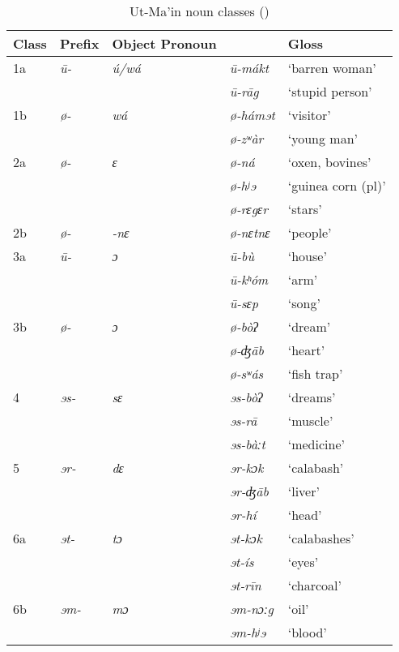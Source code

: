 \documentclass[output=paper]{langsci/langscibook}
\begin{document}
\begin{table}[t!]
\footnotesize
\caption{\label{tab:kainji:9} Ut-Ma’in noun classes (\citet{Paterson2012})}
\begin{tabularx}{\textwidth}{llXXl}
\lsptoprule
{{Class}}	& {Prefix}	& {Object Pronoun}	& {\ilit{Ut-Ma’in}}	& {{Gloss}}\\
\midrule
{1a}	& \textit{ū-}	& \textit{ú/wá}	& \textit{ū-mákt}	& {‘barren woman’}\\
	& 	& 	& \textit{ū-rāg}	& {‘stupid person’}\\
{1b}	& \textit{ø-}	& \textit{wá}	& \textit{ø-hámɘt}	& {‘visitor’}\\
	& 	& 	& \textit{ø-zʷàr}	& {‘young man’}\\
{2a}	& \textit{ø-}	& \textit{ɛ}	& \textit{ø-ná}	& {‘oxen, bovines’}\\
	& 	& 	& \textit{ø-hʲɘ}	& {‘guinea corn (pl)’}\\
	& 	& 	& \textit{ø-rɛgɛr}	& {‘stars’}\\
{2b}	& \textit{ø-}	& \textit{-nɛ}	& \textit{ø-nɛtnɛ}	& {‘people’}\\
{3a}	& \textit{\=u-}	& \textit{ɔ}	& \textit{ū-bù}	& {‘house’}\\
	& 	& 	& \textit{ū-kʰóm}	& {‘arm’}\\
	& 	& 	& \textit{ū-sɛp}	& {‘song’}\\
{3b}	& \textit{ø-}	& \textit{ɔ}	& \textit{ø-bòʔ} 	& {‘dream’}\\
	& 	& 	& \textit{ø-ʤāb}	& {‘heart’}\\
	& 	& 	& \textit{ø-sʷás}	& {‘fish trap’}\\
{4}	& \textit{ɘs-}	& \textit{sɛ}	& \textit{ɘs-bòʔ}	& {‘dreams’}\\
	& 	& 	& \textit{ɘs-rā}	& {‘muscle’}\\
	& 	& 	& \textit{ɘs-bàːt}	& {‘medicine’}\\
{5}	& \textit{ɘr-}	& \textit{dɛ}	& \textit{ɘr-kɔk}	& {‘calabash’}\\
	& 	& 	& \textit{ɘr-ʤāb}	& {‘liver’}\\
	& 	& 	& \textit{ɘr-hí}	& {‘head’}\\
{6a}	& \textit{ɘt-}	& \textit{tɔ}	& \textit{ɘt-kɔk}	& {‘calabashes’}\\
	& 	& 	& \textit{ɘt-ís}	& {‘eyes’}\\
	& 	& 	& \textit{ɘt-rīn}	& {‘charcoal’}\\
{6b}	& \textit{ɘm-}	& \textit{mɔ}	& \textit{ɘm-nɔːg}	& {‘oil’}\\
	& 	& 	& \textit{ɘm-hʲɘ}	& {‘blood’}\\

\end{tabularx}
\end{table}
\end{document}
